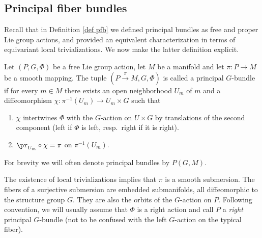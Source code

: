 \subsection{Principal fiber bundles}\label{sec: principal bundles}


Recall that in Definition \ref{def pfb} we defined principal bundles as free and proper Lie group actions, and provided an equivalent characterization in terms of equivariant local trivializations. We now make the latter definition explicit.

\begin{defn}\label{def pfb 2}
    Let $(P,G,\Phi)$ be a free Lie group action, let $M$ be a manifold and let $\pi:P\to M$ be a smooth mapping. The tuple $(P\overset{\pi}{\to}M,G,\Phi)$ is called a principal $G$-bundle if for every $m\in M$ there exists an open neighborhood $U_m$ of $m$ and a diffeomorphism $\chi:\pi^{-1}(U_m)\to U_m\times G$ such that
    \begin{enumerate}
        \item $\chi$ intertwines $\Phi$ with the $G$-action on $U\times G$ by translations of the second component (left if $\Phi$ is left, resp.\ right if it is right).
        \item $\pr_{U_m}\circ \chi=\pi$ on $\pi^{-1}(U_m)$.
    \end{enumerate}
    For brevity we will often denote principal bundles by $P(G,M)$.
\end{defn}

The existence of local trivializations implies that $\pi$ is a smooth submersion. The fibers of a surjective submersion are embedded submanifolds, all diffeomorphic to the structure group $G$. They are also the orbits of the $G$-action on $P$. Following convention, we will usually assume that $\Phi$ is a right action and call $P$ a \emph{right} principal $G$-bundle (not to be confused with the left $G$-action on the typical fiber).

